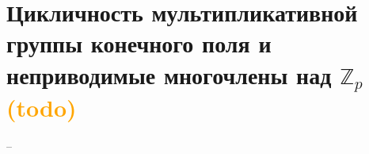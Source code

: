 \section{Цикличность мультипликативной группы конечного поля и неприводимые многочлены над \texorpdfstring{$\mathbb{Z}_p$}. \textcolor{orange}{(todo)}}
--